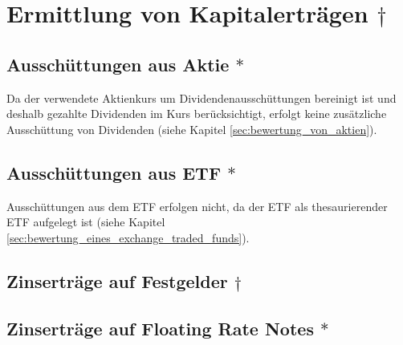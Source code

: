 \documentclass[12pt, a4paper]{article}
\begin{document}
\section{Ermittlung von Kapitalerträgen $\dagger$}
\label{sec:ermittlung_von_wertpapierertraegen}

\subsection{Ausschüttungen aus Aktie $\ast$}
\label{sec:ausschuettung_aus_aktie}
Da der verwendete Aktienkurs um Dividendenausschüttungen bereinigt ist und deshalb gezahlte Dividenden im Kurs berücksichtigt, erfolgt keine zusätzliche Ausschüttung von Dividenden (siehe Kapitel \ref{sec:bewertung_von_aktien}).

\subsection{Ausschüttungen aus ETF $\ast$}
\label{sec:ausschuettungen_aus_etf}
Ausschüttungen aus dem ETF erfolgen nicht, da der {ETF} als thesaurierender {ETF} aufgelegt ist (siehe Kapitel \ref{sec:bewertung_eines_exchange_traded_funds}).

\subsection{Zinserträge auf Festgelder $\dagger$}
\label{sec:zinsertraege_auf_festgelder}



\subsection{Zinserträge auf Floating Rate Notes $\ast$}
\label{sec:zinsertraege_auf_floating_rate_notes}

\printbibliography[title={Literatur}]
\end{document}
